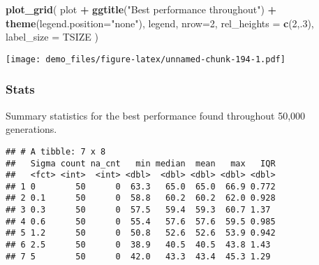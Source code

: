 \documentclass[]{book}
\newenvironment{Shaded}{\begin{snugshade}}{\end{snugshade}}
\newcommand{\DataTypeTok}[1]{\textcolor[rgb]{0.13,0.29,0.53}{#1}}
\newcommand{\DecValTok}[1]{\textcolor[rgb]{0.00,0.00,0.81}{#1}}
\newcommand{\KeywordTok}[1]{\textcolor[rgb]{0.13,0.29,0.53}{\textbf{#1}}}
\newcommand{\NormalTok}[1]{#1}
\newcommand{\OperatorTok}[1]{\textcolor[rgb]{0.81,0.36,0.00}{\textbf{#1}}}
\newcommand{\OtherTok}[1]{\textcolor[rgb]{0.56,0.35,0.01}{#1}}
\newcommand{\StringTok}[1]{\textcolor[rgb]{0.31,0.60,0.02}{#1}}
\begin{document}
\begin{Shaded}
\begin{Highlighting}[]
\KeywordTok{plot_grid}\NormalTok{(}
\NormalTok{  plot }\OperatorTok{+}
\StringTok{    }\KeywordTok{ggtitle}\NormalTok{(}\StringTok{"Best performance throughout"}\NormalTok{) }\OperatorTok{+}
\StringTok{    }\KeywordTok{theme}\NormalTok{(}\DataTypeTok{legend.position=}\StringTok{"none"}\NormalTok{),}
\NormalTok{  legend,}
  \DataTypeTok{nrow=}\DecValTok{2}\NormalTok{,}
  \DataTypeTok{rel_heights =} \KeywordTok{c}\NormalTok{(}\DecValTok{2}\NormalTok{,.}\DecValTok{3}\NormalTok{),}
  \DataTypeTok{label_size =}\NormalTok{ TSIZE}
\NormalTok{)}
\end{Highlighting}
\end{Shaded}

\texttt{[image: demo\_files/figure-latex/unnamed-chunk-194-1.pdf]}

\hypertarget{stats-37}{%
\subsubsection{Stats}\label{stats-37}}

Summary statistics for the best performance found throughout 50,000 generations.

\begin{Shaded}
\end{Shaded}

\begin{verbatim}
## # A tibble: 7 x 8
##   Sigma count na_cnt   min median  mean   max   IQR
##   <fct> <int>  <int> <dbl>  <dbl> <dbl> <dbl> <dbl>
## 1 0        50      0  63.3   65.0  65.0  66.9 0.772
## 2 0.1      50      0  58.8   60.2  60.2  62.0 0.928
## 3 0.3      50      0  57.5   59.4  59.3  60.7 1.37 
## 4 0.6      50      0  55.4   57.6  57.6  59.5 0.985
## 5 1.2      50      0  50.8   52.6  52.6  53.9 0.942
## 6 2.5      50      0  38.9   40.5  40.5  43.8 1.43 
## 7 5        50      0  42.0   43.3  43.4  45.3 1.29
\end{verbatim}
\end{document}
